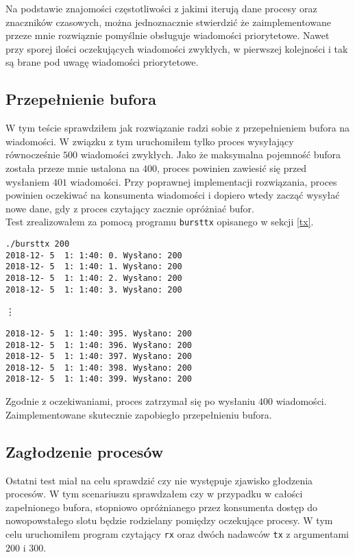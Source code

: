 \documentclass{mwrep}
\begin{document}
Na podstawie znajomości częstotliwości z jakimi iterują dane procesy oraz znaczników czasowych, można jednoznacznie
stwierdzić że zaimplementowane przeze mnie rozwiąznie pomyślnie obsługuje wiadomości priorytetowe. Nawet przy
sporej ilości oczekujących wiadomości zwykłych, w pierwszej kolejności i tak są brane pod uwagę wiadomości priorytetowe.
\newpage

\subsection{Przepełnienie bufora}
W tym teście sprawdziłem jak rozwiązanie radzi sobie z przepełnieniem bufora na wiadomości. W związku z tym
uruchomiłem tylko proces wysyłający równocześnie $500$ wiadomości zwykłych. Jako że maksymalna pojemność bufora 
została przeze mnie ustalona na $400$, proces powinien zawiesić się przed wysłaniem $401$ wiadomości. Przy poprawnej implementacji
rozwiązania, proces powinien oczekiwać na konsumenta wiadomości i dopiero wtedy zacząć wysyłać nowe dane, gdy z proces czytający
zacznie opróżniać bufor. \\

\indent Test zrealizowałem za pomocą programu \texttt{bursttx} opisanego w sekcji \ref{tx}.

\begin{verbatim}
./bursttx 200
2018-12- 5  1: 1:40: 0. Wysłano: 200
2018-12- 5  1: 1:40: 1. Wysłano: 200
2018-12- 5  1: 1:40: 2. Wysłano: 200
2018-12- 5  1: 1:40: 3. Wysłano: 200
\end{verbatim}
\vdots
\begin{verbatim}
2018-12- 5  1: 1:40: 395. Wysłano: 200
2018-12- 5  1: 1:40: 396. Wysłano: 200
2018-12- 5  1: 1:40: 397. Wysłano: 200
2018-12- 5  1: 1:40: 398. Wysłano: 200
2018-12- 5  1: 1:40: 399. Wysłano: 200
\end{verbatim}

Zgodnie z oczekiwaniami, proces zatrzymał się po wysłaniu $400$ wiadomości. Zaimplementowane skutecznie
zapobiegło przepełnieniu bufora.

\subsection{Zagłodzenie procesów}
Ostatni test miał na celu sprawdzić czy nie występuje zjawisko głodzenia procesów. 
W tym scenariuszu sprawdzałem czy w przypadku w całości zapełnionego bufora, stopniowo opróżnianego przez konsumenta
dostęp do nowopowstałego slotu będzie rodzielany pomiędzy oczekujące procesy. W tym celu uruchomiłem program czytający \texttt{rx} oraz
dwóch nadawców \texttt{tx} z argumentami $200$ i $300$. \\
\end{document}
